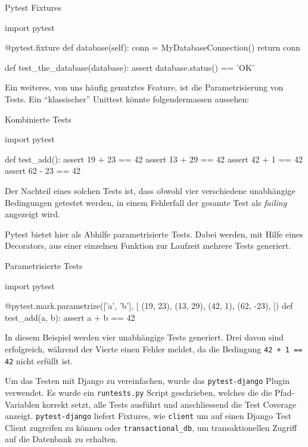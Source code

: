 \begin{listing}[H]
\caption{Pytest Fixtures}
\label{improvements:pytest-fixtures}
\begin{pythoncode}
import pytest

@pytest.fixture
def database(self):
    conn = MyDatabaseConnection()
    return conn

def test_the_database(database):
    assert database.status() == 'OK'
\end{pythoncode}
\end{listing}

Ein weiteres, von uns häufig genutztes Feature, ist die Parametrisierung von
Tests. Ein \enquote{klassischer} Unittest könnte folgendermassen aussehen:

\begin{listing}[H]
\caption{Kombinierte Tests}
\label{improvements:pytest-combined}
\begin{pythoncode}
import pytest

def test_add():
    assert 19 + 23 == 42
    assert 13 + 29 == 42
    assert 42 + 1 == 42
    assert 62 - 23 == 42
\end{pythoncode}
\end{listing}

Der Nachteil eines solchen Tests ist, dass obwohl vier verschiedene unabhängige
Bedingungen getestet werden, in einem Fehlerfall der gesamte Test als
\textit{failing} angezeigt wird.

Pytest bietet hier als Abhilfe parametrisierte Tests. Dabei werden, mit Hilfe eines
Decorators, aus einer einzelnen Funktion zur Laufzeit mehrere Tests generiert.

\begin{listing}[H]
\caption{Parametrisierte Tests}
\label{improvements:pytest-parametrize}
\begin{pythoncode}
import pytest

@pytest.mark.parametrize(['a', 'b'], [
	(19, 23),
	(13, 29),
	(42, 1),
	(62, -23),
])
def test_add(a, b):
    assert a + b == 42
\end{pythoncode}
\end{listing}

In diesem Beispiel werden vier unabhängige Tests generiert. Drei davon sind
erfolgreich, während der Vierte einen Fehler meldet, da die Bedingung
\texttt{42 + 1 == 42} nicht erfüllt ist.

Um das Testen mit Django zu vereinfachen, wurde das \texttt{pytest-django}
Plugin verwendet. Es wurde ein \texttt{runtests.py} Script geschrieben, welches
die die Pfad-Variablen korrekt setzt, alle Tests ausführt und anschliessend die
Test Coverage anzeigt. \texttt{pytest-django} liefert Fixtures, wie \zb
\texttt{client} um auf einen Django Test Client zugreifen zu können oder
\texttt{transactional\_db}, um transaktionellen Zugriff auf die Datenbank zu
erhalten.

